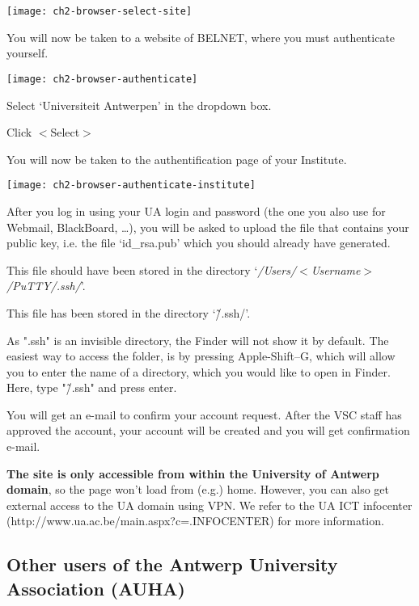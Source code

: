 \texttt{[image: ch2-browser-select-site]}

You will now be taken to a website of BELNET, where you must authenticate yourself.

\texttt{[image: ch2-browser-authenticate]}

Select `Universiteit Antwerpen' in the dropdown box.

Click $<$Select$>$

You will now be taken to the authentification page of your Institute.

\texttt{[image: ch2-browser-authenticate-institute]}

After you log in using your UA login and password (the one you also use for
Webmail, BlackBoard, \dots ), you will be asked to upload the file that
contains your public key, i.e. the file `id\_rsa.pub' which you should already
have generated.


  This file should have been stored in the directory
  `\textit{/Users/$<$Username$>$/PuTTY/.ssh/}'.

\fi




  This file has been stored in the directory `\~/.ssh/'.

  \textbf{} As ".ssh" is an invisible directory, the Finder will
  not show it by default. The easiest way to access the folder, is by pressing
  Apple-Shift--G, which will allow you to enter the name of a directory, which
  you would like to open in Finder. Here, type "\~/.ssh" and press enter.

\fi

You will get an e-mail to confirm your account request. After the VSC staff has
approved the account, your account will be created and you will get
confirmation e-mail.

\textbf{The site is only accessible from within the University of Antwerp
domain}, so the page won't load from (e.g.) home. However, you can also get
external access to the UA domain using VPN. We refer to the UA ICT infocenter
(http://www.ua.ac.be/main.aspx?c=.INFOCENTER) for more information.

\subsection{Other users of the Antwerp University Association (AUHA)}
\label{subsec:other-users-of-antwerp-university}

